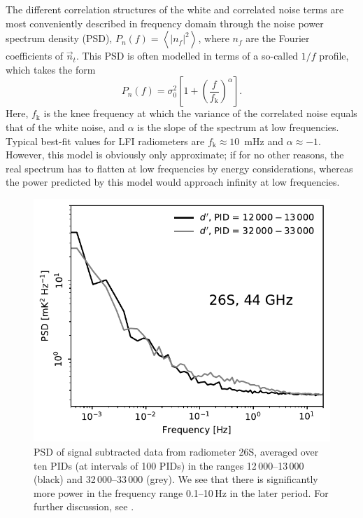 \documentclass[onecolumn]{aa}
\newcommand{\n}[0]{\vec{n}}
\begin{document}
The different correlation structures of the white and correlated noise
terms are most conveniently described in frequency domain through the
noise power spectrum density (PSD), $P_n(f) = \left<|n_f|^2\right>$,
where $n_f$ are the Fourier coefficients of $\n_t$. This PSD is often
modelled in terms of a so-called $1/f$ profile, which takes the form
\begin{equation}
  P_n(f) = \sigma_0^2 \left[1 +
    \left(\frac{f}{f_{\mathrm{k}}}\right)^{\alpha} \right].
  \label{eq:n_psd}
\end{equation}
Here, $f_\mathrm{k}$ is the knee frequency at which the variance of
the correlated noise equals that of the white noise, and $\alpha$ is
the slope of the spectrum at low frequencies. Typical best-fit values
for LFI radiometers are $f_{\mathrm{k}}\approx10$~mHz and
$\alpha\approx-1$. However, this model is obviously only approximate;
if for no other reasons, the real spectrum has to flatten at low
frequencies by energy considerations, whereas the power predicted by
this model would approach infinity at low frequencies.

\begin{figure}
        \begin{center}
                \includegraphics[width=0.5\linewidth]{figs/ps_running_mean_26S.pdf}
        \end{center}
        \caption{PSD of signal subtracted data from radiometer 26S, averaged over ten PIDs (at intervals of 100 PIDs) in the ranges 
    12\,000--13\,000 (black) and 32\,000--33\,000 (grey). We see that there is
    significantly more power in the frequency range 0.1--10\,Hz in the
    later period. For further discussion, see \citet{bp06}.
                \label{fig:ps_compare_26S}}
\end{figure}
\end{document}
